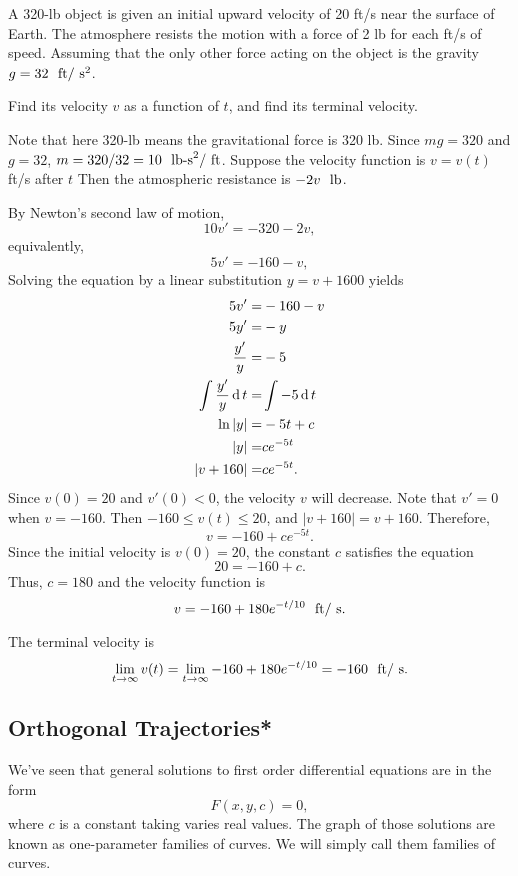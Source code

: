 \begin{exercise}
  A 320-lb object is given an initial upward velocity of 20 ft/s near the surface of Earth. The atmosphere resists the motion with a force of 2 lb for each ft/s of speed. Assuming that the only other force acting on the object is the gravity $g=32~\textup{ ft}/\textup{ s}^2$.
  
  Find its velocity $v$ as a function of $t$, and find its terminal velocity.
\end{exercise}
\begin{exersol}
  Note that here 320-lb means the gravitational force is 320 lb.
  Since $mg=320$ and $g=32$, $m=320/32=10~ \textup{ lb-s}^2/\textup{ ft}$. 
  Suppose the velocity function is $v=v(t)$ ft/s after $t$ 
  Then the atmospheric resistance is $-2v ~ \textup{ lb}$.
  
  By Newton's second law of motion, 
  \[10v'=-320-2v,\]
  equivalently,
  \[5v'=-160-v,\]
  Solving the equation by a linear substitution $y=v+1600$ yields
  \[
    \begin{aligned}
      5v'=&-160-v\\
      5y'=&-y\\
      \frac{y'}{y}=&-5\\
      \int \frac{y'}{y} \operatorname{d} t=&\int -5\operatorname{d} t\\
      \ln|y|=&-5t+c\\
      |y|=&ce^{-5t}\\
      |v+160|=&ce^{-5t}.
    \end{aligned}
    \]
Since $v(0)=20$ and $v'(0)<0$, the velocity $v$ will decrease. Note that $v'=0$ when $v=-160$. Then $-160\le v(t)\le 20$, and $|v+160|=v+160$.
Therefore, 
\[v=-160+ce^{-5t}.\] 
Since the initial velocity is $v(0)=20$, the constant $c$ satisfies the equation
\[20=-160+c.\]
Thus, $c=180$ and the velocity function is 
\[v=-160+180e^{-t/10}~\textup{ ft}/\textup{ s}.\]
  
The terminal velocity is
\[\lim\limits_{t\to\infty}v(t)=\lim\limits_{t\to\infty}-160+180e^{-t/10}=-160~\textup{ ft}/\textup{ s}.\]
\end{exersol}


\subsection{Orthogonal Trajectories*}

We've seen that general solutions to first order differential equations are in the form
\[F(x, y, c)=0,\]
where $c$ is a constant taking varies real values. The graph of those solutions are known as one-parameter families of curves. We will simply call them families of curves.

